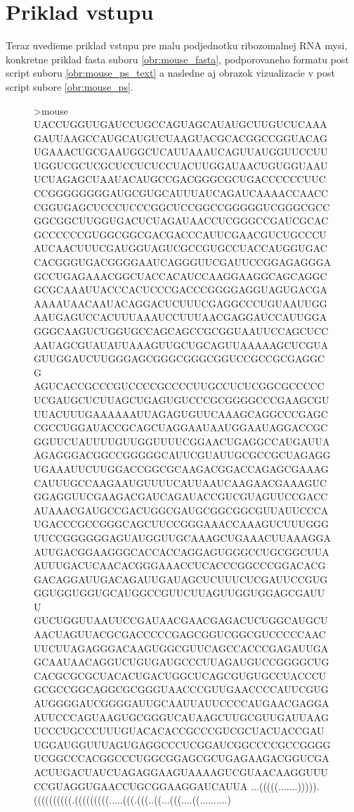 \section{Priklad vstupu}

Teraz uvedieme priklad vstupu pre malu podjednotku ribozomalnej RNA mysi, konkretne priklad
fasta suboru \ref{obr:mouse_fasta}, podporovaneho formatu post script suboru \ref{obr:mouse_ps_text}
a nasledne aj obrazok vizualizacie v post script subore \ref{obr:mouse_ps}.

\begin{figure}[H]
\begin{code}[fontsize=\scriptsize, frame=none, samepage=true]
>mouse
UACCUGGUUGAUCCUGCCAGUAGCAUAUGCUUGUCUCAAAGAUUAAGCCAUGCAUGUCUAAGUACGCACGGCCGGUACAG
UGAAACUGCGAAUGGCUCAUUAAAUCAGUUAUGGUUCCUUUGGUCGCUCGCUCCUCUCCUACUUGGAUAACUGUGGUAAU
UCUAGAGCUAAUACAUGCCGACGGGCGCUGACCCCCCUUCCCGGGGGGGGAUGCGUGCAUUUAUCAGAUCAAAACCAACC
CGGUGAGCUCCCUCCCGGCUCCGGCCGGGGGUCGGGCGCCGGCGGCUUGGUGACUCUAGAUAACCUCGGGCCGAUCGCAC
GCCCCCCGUGGCGGCGACGACCCAUUCGAACGUCUGCCCUAUCAACUUUCGAUGGUAGUCGCCGUGCCUACCAUGGUGAC
CACGGGUGACGGGGAAUCAGGGUUCGAUUCCGGAGAGGGAGCCUGAGAAACGGCUACCACAUCCAAGGAAGGCAGCAGGC
GCGCAAAUUACCCACUCCCGACCCGGGGAGGUAGUGACGAAAAAUAACAAUACAGGACUCUUUCGAGGCCCUGUAAUUGG
AAUGAGUCCACUUUAAAUCCUUUAACGAGGAUCCAUUGGAGGGCAAGUCUGGUGCCAGCAGCCGCGGUAAUUCCAGCUCC
AAUAGCGUAUAUUAAAGUUGCUGCAGUUAAAAAGCUCGUAGUUGGAUCUUGGGAGCGGGCGGGCGGUCCGCCGCGAGGCG
AGUCACCGCCCGUCCCCGCCCCUUGCCUCUCGGCGCCCCCUCGAUGCUCUUAGCUGAGUGUCCCGCGGGGCCCGAAGCGU
UUACUUUGAAAAAAUUAGAGUGUUCAAAGCAGGCCCGAGCCGCCUGGAUACCGCAGCUAGGAAUAAUGGAAUAGGACCGC
GGUUCUAUUUUGUUGGUUUUCGGAACUGAGGCCAUGAUUAAGAGGGACGGCCGGGGGCAUUCGUAUUGCGCCGCUAGAGG
UGAAAUUCUUGGACCGGCGCAAGACGGACCAGAGCGAAAGCAUUUGCCAAGAAUGUUUUCAUUAAUCAAGAACGAAAGUC
GGAGGUUCGAAGACGAUCAGAUACCGUCGUAGUUCCGACCAUAAACGAUGCCGACUGGCGAUGCGGCGGCGUUAUUCCCA
UGACCCGCCGGGCAGCUUCCGGGAAACCAAAGUCUUUGGGUUCCGGGGGGAGUAUGGUUGCAAAGCUGAAACUUAAAGGA
AUUGACGGAAGGGCACCACCAGGAGUGGGCCUGCGGCUUAAUUUGACUCAACACGGGAAACCUCACCCGGCCCGGACACG
GACAGGAUUGACAGAUUGAUAGCUCUUUCUCGAUUCCGUGGGUGGUGGUGCAUGGCCGUUCUUAGUUGGUGGAGCGAUUU
GUCUGGUUAAUUCCGAUAACGAACGAGACUCUGGCAUGCUAACUAGUUACGCGACCCCCGAGCGGUCGGCGUCCCCCAAC
UUCUUAGAGGGACAAGUGGCGUUCAGCCACCCGAGAUUGAGCAAUAACAGGUCUGUGAUGCCCUUAGAUGUCCGGGGCUG
CACGCGCGCUACACUGACUGGCUCAGCGUGUGCCUACCCUGCGCCGGCAGGCGCGGGUAACCCGUUGAACCCCAUUCGUG
AUGGGGAUCGGGGAUUGCAAUUAUUCCCCAUGAACGAGGAAUUCCCAGUAAGUGCGGGUCAUAAGCUUGCGUUGAUUAAG
UCCCUGCCCUUUGUACACACCGCCCGUCGCUACUACCGAUUGGAUGGUUUAGUGAGGCCCUCGGAUCGGCCCCGCCGGGG
UCGGCCCACGGCCCUGGCGGAGCGCUGAGAAGACGGUCGAACUUGACUAUCUAGAGGAAGUAAAAGUCGUAACAAGGUUU
CCGUAGGUGAACCUGCGGAAGGAUCAUUA
...(((((.......))))).((((((((((.(((((((((.....(((.(((..((...(((....((..........)

\end{code}
\end{figure}
